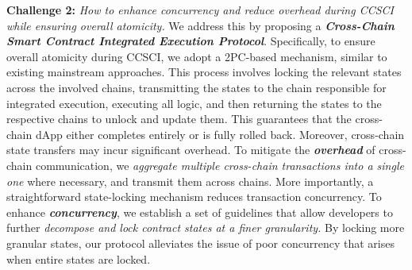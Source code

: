 \vspace{3pt}
\noindent
\textbf{Challenge 2: }
\textit{How to enhance concurrency and reduce overhead during CCSCI while ensuring overall atomicity.}
We address this by proposing a \textbf{\emph{Cross-Chain Smart Contract Integrated Execution Protocol}}.
Specifically, to ensure overall atomicity during CCSCI, we adopt a 2PC-based mechanism, similar to existing mainstream approaches.
This process involves locking the relevant states across the involved chains, transmitting the states to the chain responsible for integrated execution, executing all logic, and then returning the states to the respective chains to unlock and update them. 
This guarantees that the cross-chain dApp either completes entirely or is fully rolled back.
Moreover, cross-chain state transfers may incur significant overhead. 
To mitigate the \emph{\textbf{overhead}} of cross-chain communication, we \emph{aggregate multiple cross-chain transactions into a single one} where necessary, and transmit them across chains.
More importantly, a straightforward state-locking mechanism reduces transaction concurrency. 
To enhance \emph{\textbf{concurrency}}, we establish a set of guidelines that allow developers to further \emph{decompose and lock contract states at a finer granularity.} 
By locking more granular states, our protocol alleviates the issue of poor concurrency that arises when entire states are locked.


